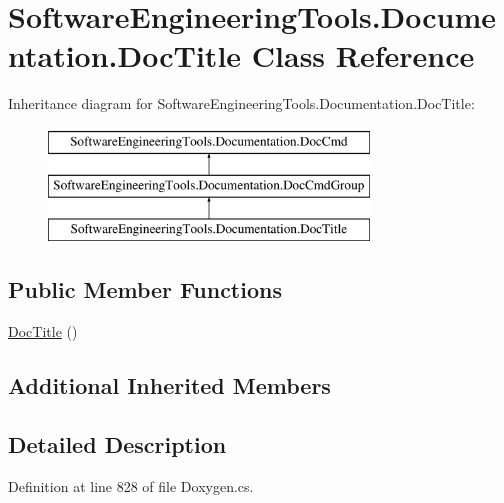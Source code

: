 \hypertarget{class_software_engineering_tools_1_1_documentation_1_1_doc_title}{\section{Software\+Engineering\+Tools.\+Documentation.\+Doc\+Title Class Reference}
\label{class_software_engineering_tools_1_1_documentation_1_1_doc_title}
}
Inheritance diagram for Software\+Engineering\+Tools.\+Documentation.\+Doc\+Title\+:\begin{figure}[H]
\begin{center}
\leavevmode
\includegraphics[height=3.000000cm]{class_software_engineering_tools_1_1_documentation_1_1_doc_title}
\end{center}
\end{figure}
\subsection*{Public Member Functions}
\begin{DoxyCompactItemize}
\item 
\hyperlink{class_software_engineering_tools_1_1_documentation_1_1_doc_title_a7b4a017d58809fcf76a89141f02f997a}{Doc\+Title} ()
\end{DoxyCompactItemize}
\subsection*{Additional Inherited Members}


\subsection{Detailed Description}


Definition at line 828 of file Doxygen.\+cs.




